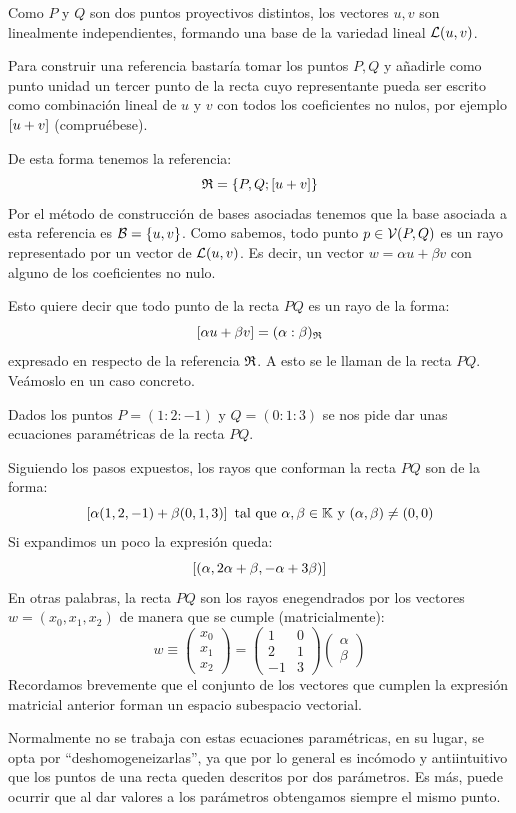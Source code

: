 Como $P$ y $Q$ son dos puntos proyectivos distintos, los vectores $u,v$ son linealmente independientes, formando una base de la variedad lineal $\mathcal{L}(u,v)$.
	
Para construir una referencia bastaría tomar los puntos $P,Q$ y añadirle como punto unidad un tercer punto de la recta cuyo representante pueda ser escrito como combinación lineal de $u$ y $v$ con todos los coeficientes no nulos, por ejemplo $\left [ u+v \right ]$ (compruébese).
	
De esta forma tenemos la referencia:
\[\mathfrak{R}=\{P,Q;\left [ u+v \right ]\}\]
Por el método de construcción de bases asociadas tenemos que la base asociada a esta referencia es $\mathcal{B}=\{u,v\}$. Como sabemos, todo punto $p\in\mathcal{V}(P,Q)$ es un rayo representado por un vector de $\mathcal{L}(u,v)$. Es decir, un vector $w=\alpha u+\beta v$ con alguno de los coeficientes no nulo.
	
Esto quiere decir que todo punto de la recta $PQ$ es un rayo de la forma: \[\left [ \alpha u+\beta v \right ]=(\alpha:\beta)_{\mathfrak{R}}\]
expresado en  respecto de la referencia $\mathfrak{R}$. A esto se le llaman  de la recta $PQ$. Veámoslo en un caso concreto.
\begin{exa}
	Dados los puntos $P=(1:2:-1)$ y $Q=(0:1:3)$ se nos pide dar unas ecuaciones paramétricas de la recta $PQ$.
	
	Siguiendo los pasos expuestos, los rayos que conforman la recta $PQ$ son de la forma:
	\[\left [ \alpha(1,2,-1)+\beta(0,1,3) \right ] \text{ tal que } \alpha,\beta\in\mathbb{K}\text{ y }(\alpha,\beta)\not=(0,0)\]
	Si expandimos un poco la expresión queda:
	\[\left [ (\alpha,2\alpha+\beta,-\alpha+3\beta) \right ]\]
	En otras palabras, la recta $PQ$ son los rayos enegendrados por los vectores $w=(x_0,x_1,x_2)$ de manera que se cumple (matricialmente):
	\[w\equiv\begin{pmatrix}
	x_0\\
	x_1\\
	x_2
	\end{pmatrix}=\begin{pmatrix}
	1 & 0\\
	2 & 1\\
	-1 & 3
	\end{pmatrix}\begin{pmatrix}
	\alpha\\
	\beta
	\end{pmatrix}\]
	Recordamos brevemente que el conjunto de los vectores que cumplen la expresión matricial anterior forman un espacio subespacio vectorial.
\end{exa}
Normalmente no se trabaja con estas ecuaciones paramétricas, en su lugar, se opta por ``deshomogeneizarlas'', ya que por lo general es incómodo y antiintuitivo que los puntos de una recta queden descritos por dos parámetros. Es más, puede ocurrir que al dar valores a los parámetros obtengamos siempre el mismo punto.

